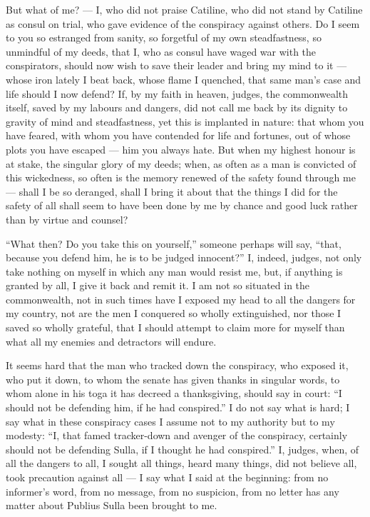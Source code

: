  But what of me? --- I, who did not praise Catiline, who did not stand by Catiline as consul on trial, who gave evidence of the conspiracy against others. Do I seem to you so estranged from sanity, so forgetful of my own steadfastness, so unmindful of my deeds, that I, who as consul have waged war with the conspirators, should now wish to save their leader and bring my mind to it --- whose iron lately I beat back, whose flame I quenched, that same man's case and life should I now defend? If, by my faith in heaven, judges, the commonwealth itself, saved by my labours and dangers, did not call me back by its dignity to gravity of mind and steadfastness, yet this is implanted in nature: that whom you have feared, with whom you have contended for life and fortunes, out of whose plots you have escaped --- him you always hate. But when my highest honour is at stake, the singular glory of my deeds; when, as often as a man is convicted of this wickedness, so often is the memory renewed of the safety found through me --- shall I be so deranged, shall I bring it about that the things I did for the safety of all shall seem to have been done by me by chance and good luck rather than by virtue and counsel?

 ``What then? Do you take this on yourself,'' someone perhaps will say, ``that, because you defend him, he is to be judged innocent?'' I, indeed, judges, not only take nothing on myself in which any man would resist me, but, if anything is granted by all, I give it back and remit it. I am not so situated in the commonwealth, not in such times have I exposed my head to all the dangers for my country, not are the men I conquered so wholly extinguished, nor those I saved so wholly grateful, that I should attempt to claim more for myself than what all my enemies and detractors will endure.

 It seems hard that the man who tracked down the conspiracy, who exposed it, who put it down, to whom the senate has given thanks in singular words, to whom alone in his toga it has decreed a thanksgiving, should say in court: ``I should not be defending him, if he had conspired.'' I do not say what is hard; I say what in these conspiracy cases I assume not to my authority but to my modesty: ``I, that famed tracker-down and avenger of the conspiracy, certainly should not be defending Sulla, if I thought he had conspired.'' I, judges, when, of all the dangers to all, I sought all things, heard many things, did not believe all, took precaution against all --- I say what I said at the beginning: from no informer's word, from no message, from no suspicion, from no letter has any matter about Publius Sulla been brought to me.

